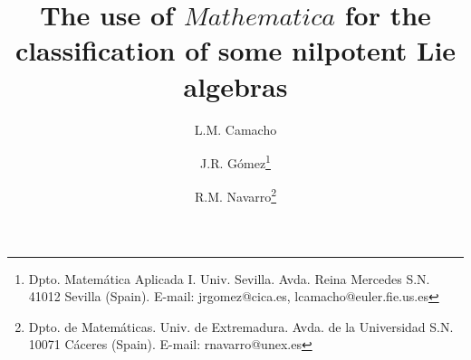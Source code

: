 \newtheorem{lema}{\bf Lemma}[section]
\newtheorem{corolario}[lema]{\bf Corolary }
\newtheorem{teorema}[lema]{\bf Theorem}
\newtheorem{ejemplo}[lema]{\bf Example}
\newtheorem{nota}[lema]{\bf Remark}
\def\demostracion{\noindent{\bf Proof: }}
\def\gg{{\got g}}
\def\CC{{\Bbb C}}
\def\KK{{\Bbb K}}
\def\NN{{\Bbb N}}
\def\RR{{\Bbb R}}
\def\ZZ{{\Bbb Z}}
\title{The use of $Mathematica$ for the
classification of some nilpotent Lie algebras}
\author {L.M. Camacho\footnotemark[1]
\and J.R. G\'{o}mez\thanks{Dpto. Matem\'{a}tica Aplicada I. Univ.
Sevilla. Avda. Reina Mercedes S.N. 41012 Sevilla (Spain).
E-mail: jrgomez@cica.es, lcamacho@euler.fie.us.es}
\and R.M. Navarro\thanks{Dpto. de Matem\'{a}ticas.
Univ. de Extremadura. Avda. de la Universidad S.N.
10071 C\'{a}ceres (Spain). E-mail: rnavarro@unex.es}}
\date{}


